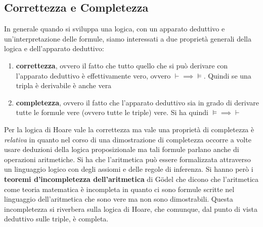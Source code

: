 				     \subsection{Correttezza e Completezza}
				      				In generale quando si sviluppa una logica, con un apparato deduttivo e
				      				un'interpretazione delle formule, siamo interessati a due proprietà generali
				      				della logica e dell'apparato deduttivo:
				      				\begin{enumerate}
				      					\item \textbf{correttezza}, ovvero il fatto che tutto quello che si può
				      					      derivare con l'apparato deduttivo è effettivamente vero, ovvero
				      					      $\vdash\implies\vDash$. Quindi se una tripla è derivabile è anche vera
				      					\item \textbf{completezza}, ovvero il fatto che l'apparato deduttivo sia in
				      					      grado di derivare tutte le formule vere (ovvero tutte le triple) vere. Si ha
				      					      quindi $\vDash\implies\vdash$
				      				\end{enumerate}
				      				Per la logica di Hoare vale la correttezza ma vale una proprietà di completezza
				      				è \textit{relativa} in quanto nel corso di una dimostrazione di completezza
				      				occorre a volte usare deduzioni della logica proposizionale ma tali formule
				      				parlano anche di operazioni aritmetiche. Si ha che l'aritmetica può essere
				      				formalizzata attraverso un linguaggio logico con degli assiomi e delle regole di
				      				inferenza. Si hanno però i \textbf{teoremi d'incompletezza dell'aritmetica} di
				      				G\"{o}del che dicono che l'aritmetica come teoria matematica è incompleta in
				      				quanto ci sono formule scritte nel linguaggio dell'aritmetica che sono vere ma
				      				non sono dimostrabili. Questa incompletezza si riverbera sulla logica di Hoare,
				      				che comunque, dal punto di vista deduttivo sulle triple, è completa.
